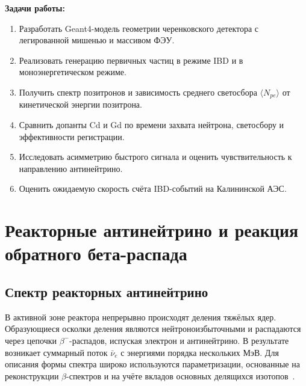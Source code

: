 \documentclass[a4paper,12pt]{extarticle}
\begin{document}
\textbf{Задачи работы:}
\begin{enumerate}
  \item Разработать Geant4-модель геометрии черенковского детектора с легированной мишенью и массивом ФЭУ.
  \item Реализовать генерацию первичных частиц в режиме IBD и в моноэнергетическом режиме.
  \item Получить спектр позитронов и зависимость среднего светосбора $\langle N_{pe}\rangle$ от кинетической энергии позитрона.
  \item Сравнить допанты Cd и Gd по времени захвата нейтрона, светосбору и эффективности регистрации.
  \item Исследовать асимметрию быстрого сигнала и оценить чувствительность к направлению антинейтрино.
  \item Оценить ожидаемую скорость счёта IBD-событий на Калининской АЭС.
\end{enumerate}

\newpage

\section{Реакторные антинейтрино и реакция обратного бета-распада}

\subsection{Спектр реакторных антинейтрино}
В активной зоне реактора непрерывно происходят деления тяжёлых ядер. Образующиеся осколки деления являются нейтроноизбыточными и распадаются через цепочки $\beta^-$-распадов, испуская электрон и антинейтрино. В результате возникает суммарный поток $\bar{\nu}_e$ с энергиями порядка нескольких МэВ. Для описания формы спектра широко используются параметризации, основанные на реконструкции $\beta$-спектров и на учёте вкладов основных делящихся изотопов~\cite{huber2011,mueller2011}.
\end{document}
